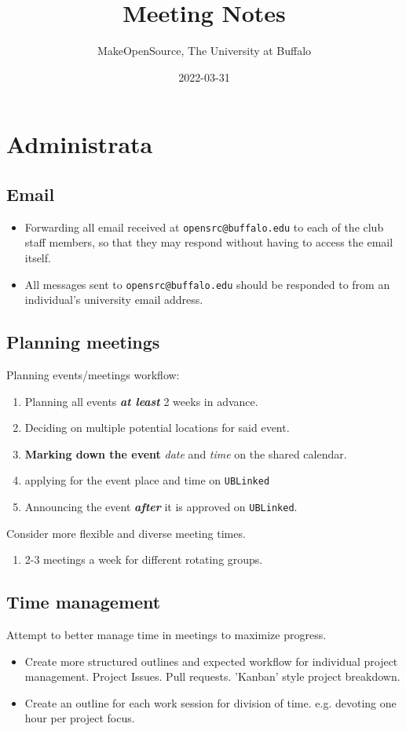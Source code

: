 \documentclass{article}
\title{Meeting Notes}
\author{MakeOpenSource, The University at Buffalo}
\date{2022-03-31}
\begin{document}
\maketitle

\tableofcontents
\clearpage

\section{Administrata}
\subsection{Email}
\begin{itemize}
    \item Forwarding all email received at \verb|opensrc@buffalo.edu| to each of the club staff members, so that they may respond without having to access the email itself.
    \item All messages sent to \verb|opensrc@buffalo.edu| should be responded to from an individual's university email address.
\end{itemize}
\par

\subsection{Planning meetings}
Planning events/meetings workflow:
\begin{enumerate}
    \item Planning all events \textit{\textbf{at least}} 2 weeks in advance.
    \item Deciding on multiple potential locations for said event.
    \item \textbf{Marking down the event} \textit{date} and \textit{time} on the shared calendar.
    \item applying for the event place and time on \verb|UBLinked|
    \item Announcing the event \textit{\textbf{after}} it is approved on \verb|UBLinked|.
\end{enumerate}
Consider more flexible and diverse meeting times.
\begin{enumerate}
    \item 2-3 meetings a week for different rotating groups.
\end{enumerate}

\subsection{Time management}
Attempt to better manage time in meetings to maximize progress.
\begin{itemize}
    \item Create more structured outlines and expected workflow for individual project management.
    \subitem Project Issues.
    \subitem Pull requests.
    \subitem 'Kanban' style project breakdown.
    \item Create an outline for each work session for division of time.
    \subitem e.g. devoting one hour per project focus.
\end{itemize}
\end{document}
